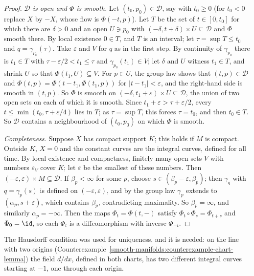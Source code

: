 \begin{proof}
\emph{$\mathcal{D}$ is open and $\Phi$ is smooth.} Let $(t_0, p_0) \in \mathcal{D}$, say with $t_0 \geq 0$ (for $t_0 < 0$ replace $X$ by $-X$, whose flow is
$\Phi(-t, p)$). Let $T$ be the set of $t \in [0, t_0]$ for which there are $\delta > 0$ and an open $U \ni p_0$ with $(-\delta, t + \delta) \times U \subseteq
\mathcal{D}$ and $\Phi$ smooth there. By local existence $0 \in T$, and $T$ is an interval; let $\tau = \sup T \leq t_0$ and $q = \gamma_{p_0}(\tau)$. Take
$\varepsilon$ and $V$ for $q$ as in the first step. By continuity of $\gamma_{p_0}$ there is $t_1 \in T$ with $\tau - \varepsilon/2 < t_1 \leq \tau$ and
$\gamma_{p_0}(t_1) \in V$; let $\delta$ and $U$ witness $t_1 \in T$, and shrink $U$ so that $\Phi(t_1, U) \subseteq V$. For $p \in U$, the group law shows that
$(t, p) \in \mathcal{D}$ and $\Phi(t, p) = \Phi(t - t_1, \Phi(t_1, p))$ for $|t - t_1| < \varepsilon$, and the right-hand side is smooth in $(t, p)$. So $\Phi$
is smooth on $(-\delta, t_1 + \varepsilon) \times U \subseteq \mathcal{D}$, the union of two open sets on each of which it is smooth. Since
$t_1 + \varepsilon > \tau + \varepsilon/2$, every $t \leq \min(t_0, \tau + \varepsilon/4)$ lies in $T$; as $\tau = \sup T$, this forces $\tau = t_0$, and then
$t_0 \in T$. So $\mathcal{D}$ contains a neighbourhood of $(t_0, p_0)$ on which $\Phi$ is smooth.

\emph{Completeness.} Suppose $X$ has compact support $K$; this holds if $M$ is compact. Outside $K$, $X = 0$ and the constant curves are the integral curves,
defined for all time. By local existence and compactness, finitely many open sets $V$ with numbers $\varepsilon_V$ cover $K$; let $\varepsilon$ be the smallest of
these numbers. Then $(-\varepsilon, \varepsilon) \times M \subseteq \mathcal{D}$. If $\beta_p < \infty$ for some $p$, choose $s \in (\beta_p - \varepsilon,
\beta_p)$; then $\gamma_q$ with $q = \gamma_p(s)$ is defined on $(-\varepsilon, \varepsilon)$, and by the group law $\gamma_p$ extends to $(\alpha_p, s + \varepsilon)$, which contains
$\beta_p$, contradicting maximality. So $\beta_p = \infty$, and similarly $\alpha_p = -\infty$. Then the maps $\Phi_t = \Phi(t, -)$ satisfy
$\Phi_t \circ \Phi_s = \Phi_{t+s}$ and $\Phi_0 = \id$, so each $\Phi_t$ is a diffeomorphism with inverse $\Phi_{-t}$.
\end{proof}

\begin{remark}\label{smooth-manifolds:remark-hausdorff-flows}
The Hausdorff condition was used for uniqueness, and it is needed: on the line with two origins (Counterexample~\ref{smooth-manifolds:counterexample-chart-lemma})
the field $d/dx$, defined in both charts, has two different integral curves starting at $-1$, one through each origin.
\end{remark}

